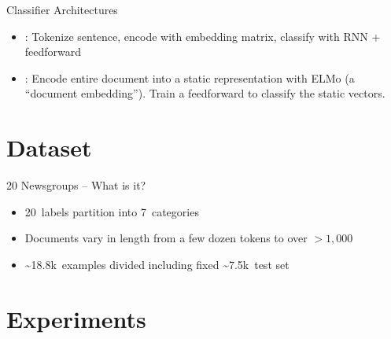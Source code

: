 \begin{frame}{Classifier Architectures}
  \vfill
  \begin{itemize}[<+->]
    \setlength{\itemsep}{24pt}
    \item {}: Tokenize sentence, encode with embedding matrix, classify with RNN + feedforward

    \item {}: Encode entire document into a static representation with ELMo (a ``document embedding'').  Train a feedforward to classify the static vectors.
  \end{itemize}
  \vfill
\end{frame}

\section{Dataset}
\begin{frame}{20 Newsgroups -- What is it?}
  \begin{itemize}
    \item 20~labels partition into 7~categories 
    \item Documents vary in length from a few dozen tokens to over ${{>}1,000}$
  \end{itemize}
  \vfill
   
  \begin{itemize}[<+->]
    \item \textasciitilde18.8k~examples divided including fixed \textasciitilde7.5k~test set
  \end{itemize}
  \vfill
  {
    \begin{center}
      \scriptsize
      \onslide<+->{}
    \end{center}
  }
\end{frame}

\section{Experiments}
